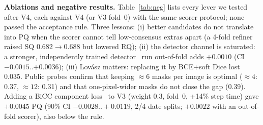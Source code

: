 \documentclass[sigconf]{acmart}
\begin{document}
\textbf{Ablations and negative results.} Table~\ref{tab:neg} lists every lever we tested after V4, each against V4 (or V3 fold~0) with the same scorer protocol; none passed the acceptance rule. Three lessons: (i) better candidates do not translate into PQ when the scorer cannot tell low-consensus extras apart (a 4-fold refiner raised SQ 0.682$\to$0.688 but lowered RQ); (ii) the detector channel is saturated: a stronger, independently trained detector~\cite{peer_saltytaro} run out-of-fold adds $+0.0010$ (CI $-0.0015$..$+0.0036$); (iii) Lov\'asz matters: replacing it by BCE+soft Dice lost 0.035. Public probes confirm that keeping ${\approx}6$ masks per image is optimal (${\approx}4$: 0.37, ${\approx}12$: 0.31) and that one-pixel-wider masks do not close the gap (0.39). Adding a BiCC component loss~\cite{bouteille2026bicc} to V3 (weight 0.3, fold~0, +14\% step time) gave $+0.0045$ PQ (90\% CI $-0.0028..+0.0119$, 2/4 date splits; $+0.0022$ with an out-of-fold scorer), also below the rule.

\begin{table}[t]
\centering\footnotesize
\setlength{\tabcolsep}{2.5pt}
\caption{Rejected changes after V4 ($\Delta$ OOF PQ vs.\ V4, or vs.\ V3 on fold~0 for f0 rows). CI: 95\% paired bootstrap ($^{\dagger}$90\%); wins: folds or date splits.}
\label{tab:neg}
\end{table}
\end{document}
